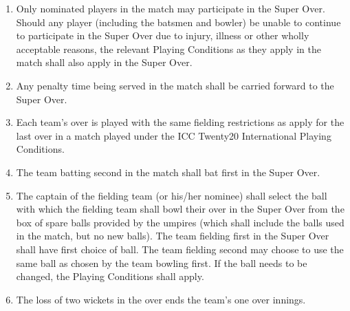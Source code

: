 \documentclass[12pt]{article}
\begin{document}
\begin{enumerate}[label*={\fontsize{9pt}{9pt}\selectfont \arabic*.}]
\vspace{\baselineskip}
	\item {\fontsize{9pt}{10.8pt}\selectfont Only nominated players in the match may participate in the Super Over. Should any player (including the batsmen and bowler) be unable to continue to participate in the Super Over due to injury, illness or other wholly acceptable reasons, the relevant Playing Conditions as they apply in the match shall also apply in the Super Over.\par}\par


\vspace{\baselineskip}
	\item {\fontsize{9pt}{10.8pt}\selectfont Any penalty time being served in the match shall be carried forward to the Super Over.\par}\par


\vspace{\baselineskip}
	\item {\fontsize{9pt}{10.8pt}\selectfont Each team’s over is played with the same fielding restrictions as apply for the last over in a match played under the ICC Twenty20 International Playing Conditions.\par}\par


\vspace{\baselineskip}
	\item {\fontsize{9pt}{10.8pt}\selectfont The team batting second in the match shall bat first in the Super Over.\par}\par


\vspace{\baselineskip}
	\item {\fontsize{9pt}{10.8pt}\selectfont The captain of the fielding team (or his/her nominee) shall select the ball with which the fielding team shall bowl their over in the Super Over from the box of spare balls provided by the umpires (which shall include the balls used in the match, but no new balls). The team fielding first in the Super Over shall have first choice of ball. The team fielding second may choose to use the same ball as chosen by the team bowling first. If the ball needs to be changed, the Playing Conditions shall apply.\par}\par


\vspace{\baselineskip}
	\item {\fontsize{9pt}{10.8pt}\selectfont The loss of two wickets in the over ends the team’s one over innings.\par}\par



\end{enumerate}
\end{document}
